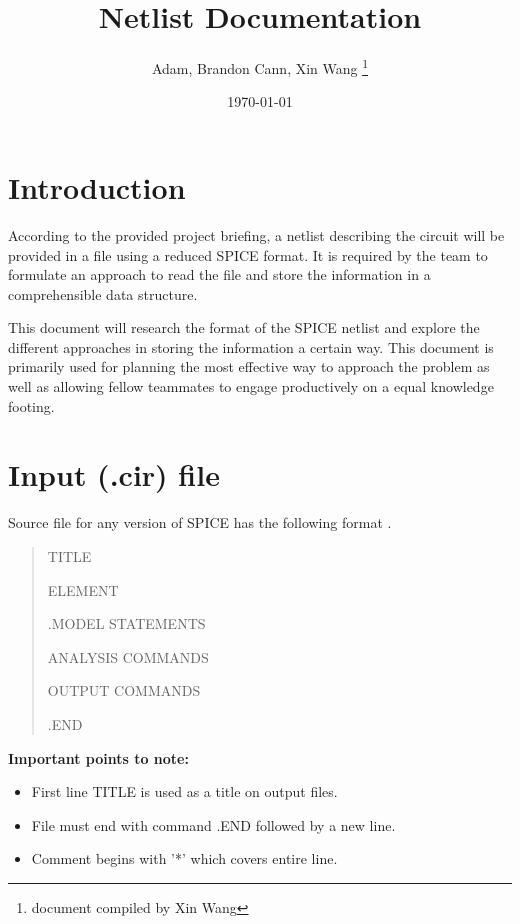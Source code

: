 \documentclass[a4paper, titlepage]{article}
\title{Netlist Documentation}
\author{Adam, Brandon Cann, Xin Wang \thanks{document compiled by Xin Wang}}
\date \today
\begin{document}
    \maketitle
    \tableofcontents
    \pagebreak
 
    \section{Introduction}
    \indent
    According to the provided project briefing, a netlist describing the circuit will be provided in a file using a reduced SPICE format. It is required by the team to formulate an approach to read the file and store the information in a comprehensible data structure. 
    \par
    This document will research the format of the SPICE netlist and explore the different approaches in storing the information a certain way. This document is primarily used for planning the most effective way to approach the problem
    as well as allowing fellow teammates to engage productively on a equal knowledge footing. 
    \section{Input (.cir) file}
    Source file for any version of SPICE has the following format \cite{spice}.
    \begin{quotation}
        {\selectfont
            TITLE \par
            ELEMENT \par
            .MODEL STATEMENTS \par
            ANALYSIS COMMANDS \par
            OUTPUT COMMANDS \par
            .END \par
        }
    \end{quotation}

    \textbf{Important points to note:}
    \begin{itemize}
        \item First line {\selectfont TITLE } is used as a title on output files.
        \item File must end with command {\selectfont .END} followed by a new line.
        \item Comment begins with '*' which covers entire line.
    \end{itemize}
\end{document}
